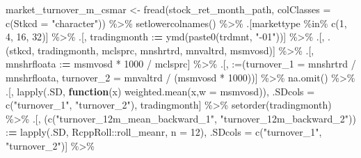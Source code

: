 \documentclass[
]{article}
\newenvironment{Shaded}{\begin{snugshade}}{\end{snugshade}}
\newcommand{\AttributeTok}[1]{\textcolor[rgb]{0.77,0.63,0.00}{#1}}
\newcommand{\ControlFlowTok}[1]{\textcolor[rgb]{0.13,0.29,0.53}{\textbf{#1}}}
\newcommand{\DecValTok}[1]{\textcolor[rgb]{0.00,0.00,0.81}{#1}}
\newcommand{\ErrorTok}[1]{\textcolor[rgb]{0.64,0.00,0.00}{\textbf{#1}}}
\newcommand{\FunctionTok}[1]{\textcolor[rgb]{0.00,0.00,0.00}{#1}}
\newcommand{\NormalTok}[1]{#1}
\newcommand{\OtherTok}[1]{\textcolor[rgb]{0.56,0.35,0.01}{#1}}
\newcommand{\SpecialCharTok}[1]{\textcolor[rgb]{0.00,0.00,0.00}{#1}}
\newcommand{\StringTok}[1]{\textcolor[rgb]{0.31,0.60,0.02}{#1}}
\begin{document}
\begin{Shaded}
\begin{Highlighting}[]
\NormalTok{market\_turnover\_m\_csmar }\OtherTok{\textless{}{-}} \FunctionTok{fread}\NormalTok{(stock\_ret\_month\_path, }\AttributeTok{colClasses =} \FunctionTok{c}\NormalTok{(}\AttributeTok{Stkcd =} \StringTok{"character"}\NormalTok{)) }\SpecialCharTok{\%\textgreater{}\%} 
  \FunctionTok{setlowercolnames}\NormalTok{() }\SpecialCharTok{\%\textgreater{}\%} 
\NormalTok{  .[markettype }\SpecialCharTok{\%in\%} \FunctionTok{c}\NormalTok{(}\DecValTok{1}\NormalTok{, }\DecValTok{4}\NormalTok{, }\DecValTok{16}\NormalTok{, }\DecValTok{32}\NormalTok{)] }\SpecialCharTok{\%\textgreater{}\%} 
\NormalTok{  .[, tradingmonth }\SpecialCharTok{:}\ErrorTok{=} \FunctionTok{ymd}\NormalTok{(}\FunctionTok{paste0}\NormalTok{(trdmnt, }\StringTok{"{-}01"}\NormalTok{))] }\SpecialCharTok{\%\textgreater{}\%} 
\NormalTok{  .[, .(stkcd, tradingmonth, mclsprc, mnshrtrd, mnvaltrd, msmvosd)] }\SpecialCharTok{\%\textgreater{}\%} 
\NormalTok{  .[, mnshrfloata }\SpecialCharTok{:}\ErrorTok{=}\NormalTok{ msmvosd }\SpecialCharTok{*} \DecValTok{1000} \SpecialCharTok{/}\NormalTok{ mclsprc] }\SpecialCharTok{\%\textgreater{}\%} 
\NormalTok{  .[, }\StringTok{\textasciigrave{}}\AttributeTok{:=}\StringTok{\textasciigrave{}}\NormalTok{(}\AttributeTok{turnover\_1 =}\NormalTok{ mnshrtrd }\SpecialCharTok{/}\NormalTok{ mnshrfloata, }\AttributeTok{turnover\_2 =}\NormalTok{ mnvaltrd }\SpecialCharTok{/}\NormalTok{ (msmvosd }\SpecialCharTok{*} \DecValTok{1000}\NormalTok{))] }\SpecialCharTok{\%\textgreater{}\%} 
  \FunctionTok{na.omit}\NormalTok{() }\SpecialCharTok{\%\textgreater{}\%} 
\NormalTok{  .[, }\FunctionTok{lapply}\NormalTok{(.SD, }\ControlFlowTok{function}\NormalTok{(x) }\FunctionTok{weighted.mean}\NormalTok{(x,}\AttributeTok{w =}\NormalTok{ msmvosd)), .SDcols }\OtherTok{=} \FunctionTok{c}\NormalTok{(}\StringTok{"turnover\_1"}\NormalTok{, }\StringTok{"turnover\_2"}\NormalTok{), tradingmonth] }\SpecialCharTok{\%\textgreater{}\%} 
  \FunctionTok{setorder}\NormalTok{(tradingmonth) }\SpecialCharTok{\%\textgreater{}\%} 
\NormalTok{  .[, (}\FunctionTok{c}\NormalTok{(}\StringTok{"turnover\_12m\_mean\_backward\_1"}\NormalTok{, }\StringTok{"turnover\_12m\_backward\_2"}\NormalTok{)) }\SpecialCharTok{:}\ErrorTok{=} \FunctionTok{lapply}\NormalTok{(.SD, RcppRoll}\SpecialCharTok{::}\NormalTok{roll\_meanr, }\AttributeTok{n =} \DecValTok{12}\NormalTok{), .SDcols }\OtherTok{=} \FunctionTok{c}\NormalTok{(}\StringTok{"turnover\_1"}\NormalTok{, }\StringTok{"turnover\_2"}\NormalTok{)] }\SpecialCharTok{\%\textgreater{}\%} 

\end{Highlighting}
\end{Shaded}
\end{document}
